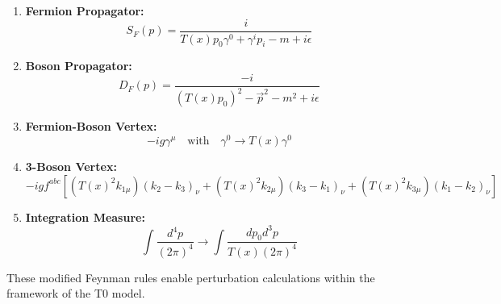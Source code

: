 \documentclass{article}
\theoremstyle{definition}
\theoremstyle{remark}
\newcommand{\Tfield}{T(x)} %
\begin{document}
	\begin{enumerate}
		\item \textbf{Fermion Propagator:}
		\begin{equation}
			S_F(p) = \frac{i}{\Tfield p_0 \gamma^0 + \gamma^i p_i - m + i\epsilon}
		\end{equation}
		
		\item \textbf{Boson Propagator:}
		\begin{equation}
			D_F(p) = \frac{-i}{(\Tfield p_0)^2 - \vec{p}^2 - m^2 + i\epsilon}
		\end{equation}
		
		\item \textbf{Fermion-Boson Vertex:}
		\begin{equation}
			-ig\gamma^\mu \quad \text{with} \quad \gamma^0 \rightarrow \Tfield \gamma^0
		\end{equation}
		
		\item \textbf{3-Boson Vertex:}
		\begin{equation}
			-ig f^{abc}[(\Tfield^2 k_{1\mu})(k_2 - k_3)_\nu + (\Tfield^2 k_{2\mu})(k_3 - k_1)_\nu + (\Tfield^2 k_{3\mu})(k_1 - k_2)_\nu]
		\end{equation}
		
		\item \textbf{Integration Measure:}
		\begin{equation}
			\int \frac{d^4p}{(2\pi)^4} \rightarrow \int \frac{dp_0 d^3p}{\Tfield (2\pi)^4}
		\end{equation}
	\end{enumerate}
	
	These modified Feynman rules enable perturbation calculations within the framework of the T0 model.
	
\end{document}
